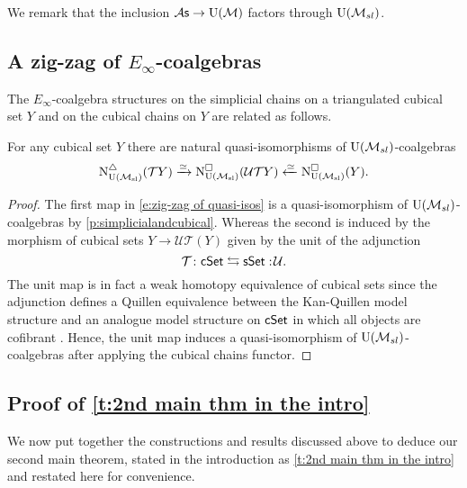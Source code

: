 We remark that the inclusion ${\mathcal{A}\mathsf{s}} \to {\operatorname{U}(\mathcal{M})}$ factors through ${\operatorname{U}(\mathcal{M}_{sl})}$.

\subsection{A zig-zag of $E_\infty$-coalgebras}
The $E_{\infty}$-coalgebra structures on the simplicial chains on a triangulated cubical set $Y$ and on the cubical chains on $Y$ are related as follows.

\begin{lemma} \label{l:zigzag} 
	For any cubical set $Y$ there are natural quasi-isomorphisms of ${\operatorname{U}(\mathcal{M}_{sl})}$-coalgebras
	\begin{equation} \label{e:zig-zag of quasi-isos}
	\operatorname{N^{\triangle}_{{\operatorname{U}(\mathcal{M}_{sl})}}}(\mathcal{T}Y) \xrightarrow{\simeq}
	\operatorname{N^{\square}_{{\operatorname{U}(\mathcal{M}_{sl})}}}(\mathcal{U}\mathcal{T}Y) \xleftarrow{\simeq}
	\operatorname{N^{\square}_{{\operatorname{U}(\mathcal{M}_{sl})}}}(Y).
	\end{equation}	
\end{lemma}

\begin{proof}
	The first map in \eqref{e:zig-zag of quasi-isos} is a quasi-isomorphism of ${\operatorname{U}(\mathcal{M}_{sl})}$-coalgebras by \cref{p:simplicialandcubical}.
	Whereas the second is induced by the morphism of cubical sets $Y \to \mathcal{U} \mathcal{T} (Y)$ given by the unit of the adjunction
	\begin{equation*}
	\mathcal{T} \colon \mathsf{cSet} \leftrightarrows \mathsf{sSet} :\! \mathcal{U}.
	\end{equation*}
	The unit map is in fact a weak homotopy equivalence of cubical sets since the adjunction defines a Quillen equivalence between the Kan-Quillen model structure and an analogue model structure on $\mathsf{cSet}$ in which all objects are cofibrant \cite{cisinski2006presheaves}.
	Hence, the unit map induces a quasi-isomorphism of ${\operatorname{U}(\mathcal{M}_{sl})}$-coalgebras after applying the cubical chains functor.
\end{proof}

\subsection{Proof of \cref{t:2nd main thm in the intro}}

We now put together the constructions and results discussed above to deduce our second main theorem, stated in the introduction as \cref{t:2nd main thm in the intro} and restated here for convenience.

